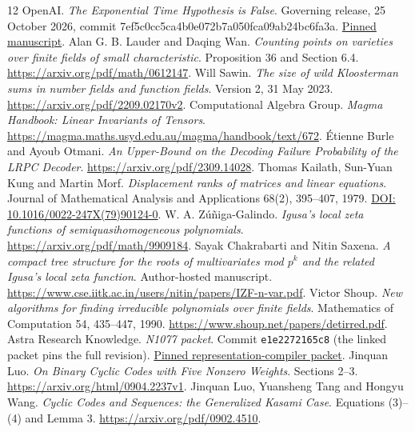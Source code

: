 \begin{thebibliography}{12}
 OpenAI. \emph{The Exponential Time Hypothesis is False}.
Governing release, 25 October 2026, commit 7ef5c0cc5ca4b0e072b7a050fca09ab24bc6fa3a.
\href{https://github.com/openai/math/blob/7ef5c0cc5ca4b0e072b7a050fca09ab24bc6fa3a/preprints/The-Exponential-Time-Hypothesis-is-False-October-25-2026/paper.pdf}{Pinned manuscript}.
 Alan G. B. Lauder and Daqing Wan.
\emph{Counting points on varieties over finite fields of small characteristic}.
Proposition 36 and Section 6.4. \url{https://arxiv.org/pdf/math/0612147}.
 Will Sawin.
\emph{The size of wild Kloosterman sums in number fields and function fields}.
Version 2, 31 May 2023. \url{https://arxiv.org/pdf/2209.02170v2}.
 Computational Algebra Group.
\emph{Magma Handbook: Linear Invariants of Tensors}.
\url{https://magma.maths.usyd.edu.au/magma/handbook/text/672}.
 \'Etienne Burle and Ayoub Otmani.
\emph{An Upper-Bound on the Decoding Failure Probability of the LRPC Decoder}.
\url{https://arxiv.org/pdf/2309.14028}.
 Thomas Kailath, Sun-Yuan Kung and Martin Morf.
\emph{Displacement ranks of matrices and linear equations}.
Journal of Mathematical Analysis and Applications 68(2), 395--407, 1979.
\href{https://doi.org/10.1016/0022-247X(79)90124-0}{DOI: 10.1016/0022-247X(79)90124-0}.
 W. A. Z\'u\~niga-Galindo.
\emph{Igusa's local zeta functions of semiquasihomogeneous polynomials}.
\url{https://arxiv.org/pdf/math/9909184}.
 Sayak Chakrabarti and Nitin Saxena.
\emph{A compact tree structure for the roots of multivariates mod $p^k$
and the related Igusa's local zeta function}. Author-hosted manuscript.
\url{https://www.cse.iitk.ac.in/users/nitin/papers/IZF-n-var.pdf}.
 Victor Shoup.
\emph{New algorithms for finding irreducible polynomials over finite fields}.
Mathematics of Computation 54, 435--447, 1990.
\url{https://www.shoup.net/papers/detirred.pdf}.
 Astra Research Knowledge. \emph{N1077 packet}.
Commit \texttt{e1e2272165c8} (the linked packet pins the full revision).
\href{https://github.com/harjassand/astra-research-knowledge/blob/e1e2272165c8548326c31bb11817c28f871d21e9/knowledge/current/packets/N1077.json}{Pinned representation-compiler packet}.
 Jinquan Luo.
\emph{On Binary Cyclic Codes with Five Nonzero Weights}.
Sections 2--3. \url{https://arxiv.org/html/0904.2237v1}.
 Jinquan Luo, Yuansheng Tang and Hongyu Wang.
\emph{Cyclic Codes and Sequences: the Generalized Kasami Case}.
Equations (3)--(4) and Lemma 3. \url{https://arxiv.org/pdf/0902.4510}.
\end{thebibliography}
